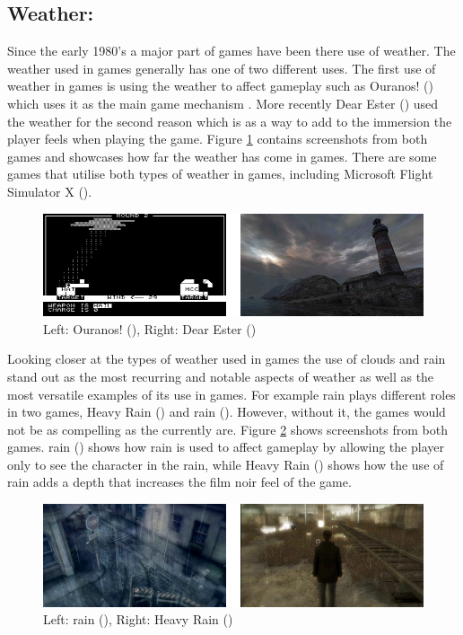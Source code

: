 \subsection{Weather:}
\label{sec:weather}
Since the early 1980's a major part of games have been there use of weather.
The weather used in games generally has one of two different uses.
The first use of weather in games is using the weather to affect gameplay such as Ouranos! (\citeyear{Ouranos80}) which uses it as the main game mechanism .
More recently Dear Ester (\citeyear{DearEsther12}) used the weather for the second reason which is as a way to add to the immersion the player feels when playing the game.
Figure \ref{fig:de_o} contains screenshots from both games and showcases how far the weather has come in games.
There are some games that utilise both types of weather in games, including Microsoft Flight Simulator X (\citeyear{MFS03}). 


\begin{figure}[ht!]
	\centering
	\includegraphics[width=\textwidth]{images/dear_esther.PNG}
	\caption{Left: Ouranos! (\citeyear{Ouranos80}), Right: Dear Ester (\citeyear{DearEsther12})}
	\label{fig:de_o}
\end{figure}


Looking closer at the types of weather used in games the use of clouds and rain stand out as the most recurring and notable aspects of weather as well as the most versatile examples of its use in games.
For example rain plays different roles in two games, Heavy Rain (\citeyear{HeavyRain10}) and rain (\citeyear{rain13}).
However, without it, the games would not be as compelling as the currently are.
Figure \ref{fig:rain_heavy_rain} shows screenshots from both games.
rain (\citeyear{rain13}) shows how rain is used to affect gameplay by allowing the player only to see the character in the rain, while Heavy Rain (\citeyear{HeavyRain10}) shows how the use of rain adds a depth that increases the film noir feel of the game.


\begin{figure}[ht!]
	\centering
	\includegraphics[width=\textwidth]{images/rain_heavy_rain.PNG}
	\caption{Left: rain (\citeyear{rain13}), Right: Heavy Rain (\citeyear{HeavyRain10})}
	\label{fig:rain_heavy_rain}
\end{figure}


